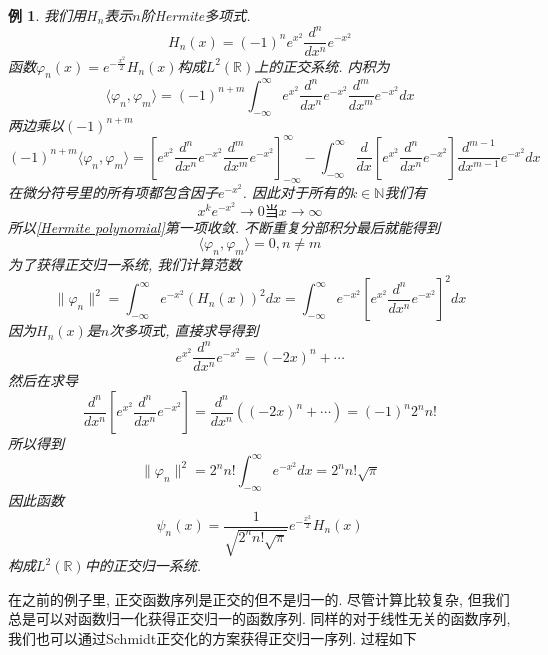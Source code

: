 \documentclass[a4paper,11pt]{article}
\theoremstyle{mystyle}
\newtheorem{example}{\hspace{2em}例}[section]
\begin{document}
\begin{example}
  我们用$H_n$表示$n$阶Hermite多项式.
  \begin{equation*}
    H_n(x)=(-1)^ne^{x^2}\frac{d^n}{dx^n}e^{-x^2}
  \end{equation*}
  函数$\varphi_n(x)=e^{-\frac{x^2}{2}}H_n(x)$构成$L^2(\mathbb{R})$上的正交系统. 内积为
  \begin{equation*}
    \langle\varphi_n,\varphi_m\rangle=(-1)^{n+m}\int_{-\infty}^{\infty}e^{x^2}\frac{d^n}{dx^n}e^{-x^2}\frac{d^m}{dx^m}e^{-x^2}dx
  \end{equation*}
  两边乘以$(-1)^{n+m}$
  \begin{equation}\label{Hermite polynomial}
    (-1)^{n+m}\langle\varphi_n,\varphi_m\rangle=\left[ e^{x^2}\frac{d^n}{dx^n}e^{-x^2}\frac{d^m}{dx^m}e^{-x^2}\right]^{\infty}_{-\infty}-\int_{-\infty}^{\infty}\frac{d}{dx}\left[e^{x^2}\frac{d^n}{dx^n}e^{-x^2}\right]\frac{d^{m-1}}{dx^{m-1}}e^{-x^2}dx
  \end{equation}
  在微分符号里的所有项都包含因子$e^{-x^2}$. 因此对于所有的$k\in \mathbb{N}$我们有
  \begin{equation*}
    x^ke^{-x^2}\to 0\text{当}x\to\infty
  \end{equation*}
  所以\eqref{Hermite polynomial}第一项收敛. 不断重复分部积分最后就能得到
  \begin{equation*}
    \langle\varphi_n,\varphi_m\rangle=0, n\neq m
  \end{equation*}
  为了获得正交归一系统, 我们计算范数
  \begin{equation*}
    \|\varphi_n\|^2=\int_{-\infty}^{\infty}e^{-x^2}(H_n(x))^2dx=\int_{-\infty}^{\infty}e^{-x^2}\left[e^{x^2}\frac{d^n}{dx^n}e^{-x^2}\right]^2dx
  \end{equation*}
  因为$H_n(x)$是$n$次多项式, 直接求导得到
  \begin{equation*}
    e^{x^2}\frac{d^n}{dx^n}e^{-x^2}=(-2x)^n+\cdots
  \end{equation*}
  然后在求导
  \begin{equation*}
    \frac{d^n}{dx^n}\left[e^{x^2}\frac{d^n}{dx^n}e^{-x^2}\right]=\frac{d^n}{dx^n}((-2x)^n+\cdots)=(-1)^n2^nn!
  \end{equation*}
  所以得到
  \begin{equation*}
    \|\varphi_n\|^2=2^nn!\int_{-\infty}^{\infty}e^{-x^2}dx=2^nn!\sqrt{\pi}
  \end{equation*}
  因此函数
  \begin{equation*}
    \psi_n(x)=\frac{1}{\sqrt{2^nn!\sqrt{\pi}}}e^{-\frac{x^2}{2}}H_n(x)
  \end{equation*}
  构成$L^2(\mathbb{R})$中的正交归一系统.
\end{example}
在之前的例子里, 正交函数序列是正交的但不是归一的. 尽管计算比较复杂, 但我们总是可以对函数归一化获得正交归一的函数序列. 同样的对于线性无关的函数序列, 我们也可以通过Schmidt正交化的方案获得正交归一序列. 过程如下
\end{document}
